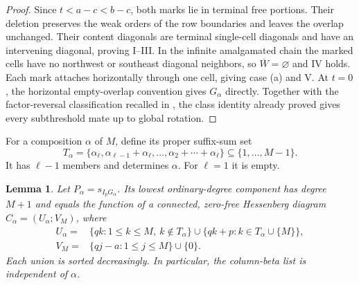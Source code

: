 \documentclass[11pt,a4paper]{amsart}
\numberwithin{equation}{section}
\theoremstyle{plain}
\newtheorem{lemma}[theorem]{Lemma}
\theoremstyle{definition}
\begin{document}
\begin{proof}
Since \(t<a-c<b-c\), both marks lie in terminal free portions.
Their deletion preserves the weak orders of the row boundaries and
leaves the overlap unchanged.  Their content diagonals are terminal
single-cell diagonals and have an intervening diagonal, proving I--III.
In the infinite amalgamated chain the marked cells have no northwest or
southeast diagonal neighbors, so \(\overline W=\varnothing\) and
IV holds.  Each mark attaches horizontally through one cell, giving
case (a) and V.  At \(t=0\), the horizontal empty-overlap convention
gives \(G_\alpha\) directly.  Together with the factor-reversal
classification recalled in , the class
identity already proved gives every subthreshold mate up to global rotation.
\end{proof}

For a composition \(\alpha\) of \(M\), define its proper suffix-sum
set
\begin{equation}\label{eq:suffix-set}
 T_\alpha=\{\alpha_\ell,\alpha_{\ell-1}+\alpha_\ell,
          \ldots,\alpha_2+\cdots+\alpha_\ell\}
 \subseteq\{1,\ldots,M-1\}.
\end{equation}
It has \(\ell-1\) members and determines \(\alpha\).  For
\(\ell=1\) it is empty.

\begin{lemma}\label{lem:boundary-core}
Let \(P_\alpha=s_{I_pG_\alpha}\).  Its lowest ordinary-degree
component has degree \(M+1\) and equals the function of a connected,
zero-free Hessenberg diagram \(C_\alpha=(U_\alpha;V_M)\), where
\begin{equation}\label{eq:boundary-core-lists}
 \begin{aligned}
 U_\alpha={}&\{qk:1\le k\le M,\ k\notin T_\alpha\}
       \cup\{qk+p:k\in T_\alpha\cup\{M\}\},\\
 V_M={}&\{qj-a:1\le j\le M\}\cup\{0\}.
 \end{aligned}
\end{equation}
Each union is sorted decreasingly.  In particular, the column-beta list
is independent of \(\alpha\).
\end{lemma}
\end{document}
